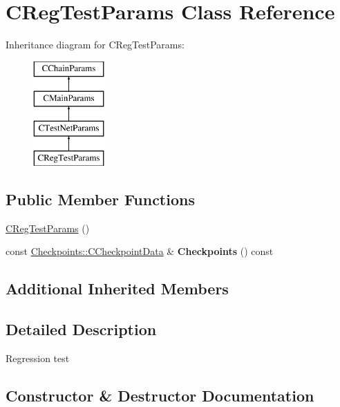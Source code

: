 \hypertarget{class_c_reg_test_params}{}\section{C\+Reg\+Test\+Params Class Reference}
\label{class_c_reg_test_params}
Inheritance diagram for C\+Reg\+Test\+Params\+:\begin{figure}[H]
\begin{center}
\leavevmode
\includegraphics[height=4.000000cm]{class_c_reg_test_params}
\end{center}
\end{figure}
\subsection*{Public Member Functions}
\begin{DoxyCompactItemize}
\item 
\mbox{\hyperlink{class_c_reg_test_params_aceca5a50765323f150ac608ca43db4fd}{C\+Reg\+Test\+Params}} ()
\item 
\mbox{\label{class_c_reg_test_params_a35c41705020a5f5a4cf461ce00b954f0}} 
const \mbox{\hyperlink{struct_checkpoints_1_1_c_checkpoint_data}{Checkpoints\+::\+C\+Checkpoint\+Data}} \& {\bfseries Checkpoints} () const
\end{DoxyCompactItemize}
\subsection*{Additional Inherited Members}


\subsection{Detailed Description}
Regression test 

\subsection{Constructor \& Destructor Documentation}
\mbox{\label{class_c_reg_test_params_aceca5a50765323f150ac608ca43db4fd}} 

